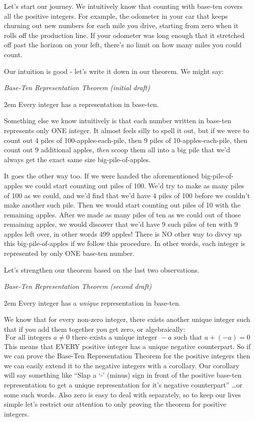 \documentclass{article}
\newenvironment{jprIn}{\begin{adjustwidth}{2em}{}}{\end{adjustwidth}}
\begin{document}
\break
Let's start our journey. We intuitively know that counting with
base-ten covers all the positive integers.
For example, the odometer in your car that keeps churning out
new numbers for each mile you drive, starting from zero when it rolls
off the production line.  If your odometer was long enough that it 
stretched off past the horizon on your left, there's no limit on
how many miles you could count.

Our intuition is good - let's write it down
in our theorem. We might say:

\emph{Base-Ten Representation Theorem (initial draft)}
\begin{jprIn}
Every integer has a representation in base-ten.
\end{jprIn}

\bigskip
Something else we know intuitively is that each number written
in base-ten represents only ONE integer.
It almost feels silly to spell it out, but if we were to count out
4 piles of 100-apples-each-pile, then 9 piles of 10-apples-each-pile,
then count out 9 additional apples, \emph{then}
scoop them all into a big pile that
we'd always get the exact same size big-pile-of-apples.

It goes the other way too. If we were handed the aforementioned
big-pile-of-apples we could start counting out
piles of 100. We'd try to make as many piles of 100 as we could,
and we'd find that we'd have 4 piles of 100 before
we couldn't make another such pile.
Then we would start counting out piles of 10 with the remaining apples.
After we made as many piles of ten as we could out of those remaining apples,
we would discover that we'd have 9 such piles of ten
with 9 apples left over, in other words 499 apples! There is NO other
way to divvy up this big-pile-of-apples
if we follow this procedure.  In other words, each integer is
represented by only ONE base-ten number.

Let's strengthen our theorem based on the last two observations.

\emph{Base-Ten Representation Theorem (second draft)}
\begin{jprIn}
Every integer has a \emph{unique} representation in base-ten.
\end{jprIn}

\bigskip
We know that for every non-zero integer,
there exists another unique integer
such that if you add them together you get zero, or algebraically:
\[\text{For all integers }a\ne0\text{ there exists a unique integer }{-}a\text{ such that }a+(-a)=0\]
This means that EVERY positive integer has a unique negative counterpart.
So if we can prove the
Base-Ten Representation Theorem for the positive integers then we
can easily extend it to the negative integers with a corollary.
Our corollary will say something like ``Slap a `-' (minus)
sign in front of the positive base-ten representation to 
get a unique representation for
it's negative counterpart'' \dots{}or some such words.
Also zero is easy to deal with separately, so to keep our lives
simple let's restrict our attention to only proving the theorem for positive integers.
\end{document}
